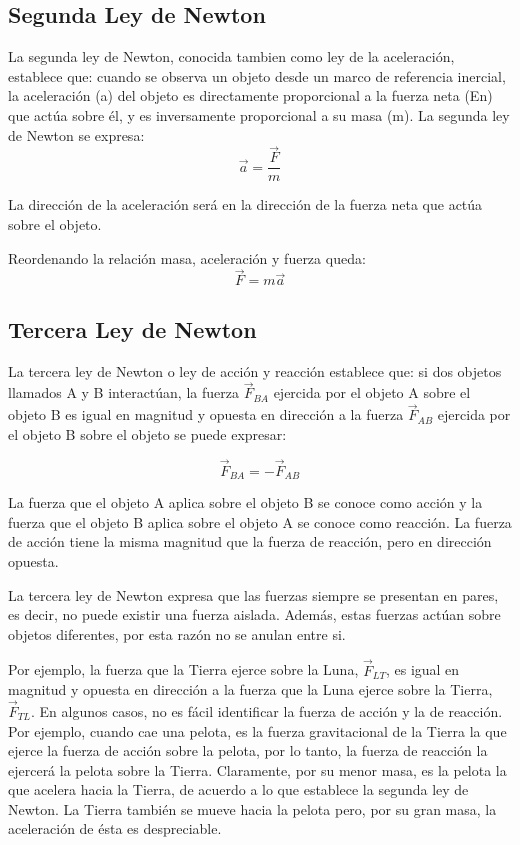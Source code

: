 \documentclass[11pt]{book}
\begin{document}
\subsection{Segunda Ley de Newton}
La segunda ley de Newton, conocida tambien como ley de la aceleración, establece que:
cuando se observa un objeto desde un marco de referencia inercial, la aceleración (a)
del objeto es directamente proporcional a la fuerza neta (En) que actúa sobre él,
y es inversamente proporcional a su masa (m).
La segunda ley de Newton se expresa:
\begin{equation}
  \vec{a}=\frac{\vec{F}}{m}
\end{equation}

La dirección de la aceleración será en la dirección de la fuerza neta que actúa sobre el objeto.

Reordenando la relación masa, aceleración y fuerza queda:
\begin{equation}
  \vec{F}=m\vec{a}
\end{equation}

\subsection{Tercera Ley de Newton}
La tercera ley de Newton o ley de acción y reacción establece que: si dos objetos llamados A y B
interactúan, la fuerza $\vec{F}_{BA}$ ejercida por el objeto A sobre el objeto B es igual en
magnitud y opuesta en dirección a la fuerza $\vec{F}_{AB}$ ejercida por el objeto B sobre el
objeto se puede
expresar:

\begin{equation}
  \vec{F}_{BA}=-\vec{F}_{AB}
\end{equation}


La fuerza que el objeto A aplica sobre el objeto B se conoce como
acción y la fuerza que el objeto B aplica sobre el objeto A se conoce
como reacción. La fuerza de acción tiene la misma magnitud que la
fuerza de reacción, pero en dirección opuesta.

La tercera ley de Newton expresa que las fuerzas siempre se presentan
en pares, es decir, no puede existir una fuerza aislada. Además, estas fuerzas actúan
sobre objetos diferentes, por esta razón no se anulan entre si.

Por ejemplo, la fuerza que la Tierra ejerce sobre la Luna, $\vec{F}_{LT}$, es igual
en magnitud y opuesta en dirección a la fuerza que la Luna ejerce sobre la Tierra, $\vec{F}_{TL}$.
En algunos casos, no es fácil identificar la fuerza de acción y la de reacción.
Por ejemplo, cuando cae una pelota, es la fuerza gravitacional de la Tierra la que ejerce la fuerza
de acción sobre la pelota, por lo tanto, la fuerza de reacción la ejercerá la pelota sobre la Tierra.
Claramente, por su menor masa, es la pelota la que acelera hacia la Tierra, de acuerdo a lo que
establece la segunda ley de Newton. La Tierra también se mueve hacia la pelota pero, por su gran masa,
la aceleración de ésta es despreciable.
\newpage \thispagestyle{plain}
\end{document}
